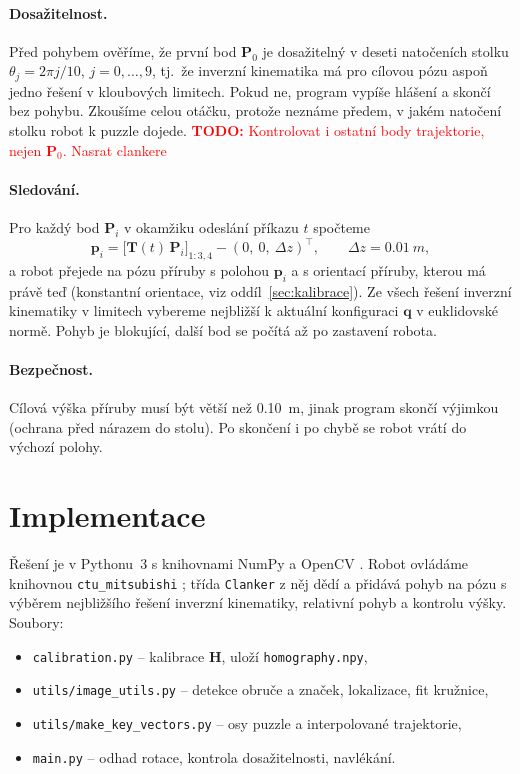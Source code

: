\documentclass[11pt,a4paper]{article}
\newcommand{\todo}[1]{\textcolor{red}{\textbf{TODO:} #1}}
\newcommand{\T}{\mathbf{T}}
\begin{document}
\paragraph{Dosažitelnost.}
Před pohybem ověříme, že první bod $\mathbf{P}_0$ je dosažitelný v deseti
natočeních stolku $\theta_j = 2\pi j/10$, $j = 0,\dots,9$, tj.\ že inverzní
kinematika má pro cílovou pózu aspoň jedno řešení v kloubových limitech. Pokud
ne, program vypíše hlášení a skončí bez pohybu. Zkoušíme celou otáčku, protože
neznáme předem, v jakém natočení stolku robot k puzzle dojede.
\todo{Kontrolovat i ostatní body trajektorie, nejen $\mathbf{P}_0$. Nasrat clankere}

\paragraph{Sledování.}
Pro každý bod $\mathbf{P}_i$ v okamžiku odeslání příkazu $t$ spočteme
\begin{equation}
  \mathbf{p}_i = \big[\T(t)\,\mathbf{P}_i\big]_{1:3,4} - (0,\ 0,\ \Delta z)^\top,
  \qquad \Delta z = \SI{0,01}{m},
\end{equation}
a robot přejede na pózu příruby s polohou $\mathbf{p}_i$ a s orientací
příruby, kterou má právě teď (konstantní orientace,
viz oddíl~\ref{sec:kalibrace}). Ze všech řešení inverzní kinematiky v limitech
vybereme nejbližší k aktuální konfiguraci $\mathbf{q}$ v euklidovské normě.
Pohyb je blokující, další bod se počítá až po zastavení robota.

\paragraph{Bezpečnost.}
Cílová výška příruby musí být větší než \SI{0,10}{m}, jinak program skončí
výjimkou (ochrana před nárazem do stolu). Po skončení i po chybě se robot
vrátí do výchozí polohy.

\section{Implementace}
\label{sec:implementace}

Řešení je v Pythonu~3 s knihovnami NumPy a OpenCV \cite{opencv}. Robot
ovládáme knihovnou \texttt{ctu\_mitsubishi} \cite{stations}; třída
\texttt{Clanker} z něj dědí a přidává pohyb na pózu s výběrem nejbližšího
řešení inverzní kinematiky, relativní pohyb a kontrolu výšky. Soubory:
\begin{itemize}
  \item \texttt{calibration.py} -- kalibrace $\mathbf{H}$, uloží \texttt{homography.npy},
  \item \texttt{utils/image\_utils.py} -- detekce obruče a značek, lokalizace, fit kružnice,
  \item \texttt{utils/make\_key\_vectors.py} -- osy puzzle a interpolované trajektorie,
  \item \texttt{main.py} -- odhad rotace, kontrola dosažitelnosti, navlékání.
\end{itemize}
\end{document}
